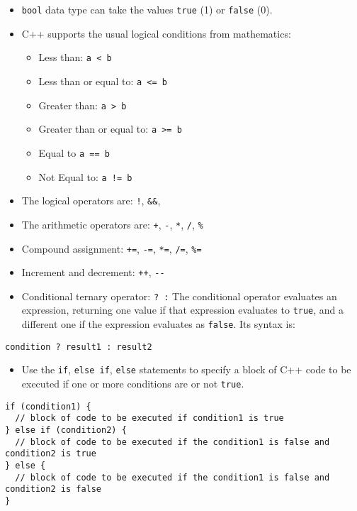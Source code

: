 \begin{itemize}
\tightlist
\item
  \texttt{bool} data type can take the values \texttt{true} (1) or \texttt{false} (0).
\item
  C++ supports the usual logical conditions from mathematics:

  \begin{itemize}
  \tightlist
  \item
    Less than: \texttt{a\ \textless{}\ b}
  \item
    Less than or equal to: \texttt{a\ \textless{}=\ b}
  \item
    Greater than: \texttt{a\ \textgreater{}\ b}
  \item
    Greater than or equal to: \texttt{a\ \textgreater{}=\ b}
  \item
    Equal to \texttt{a\ ==\ b}
  \item
    Not Equal to: \texttt{a\ !=\ b}
  \end{itemize}
\item
  The logical operators are: \texttt{!}, \texttt{\&\&}, \texttt{\textbar{}\textbar{}}
\item
  The arithmetic operators are: \texttt{+}, \texttt{-}, \texttt{*}, \texttt{/}, \texttt{\%}
\item
  Compound assignment: \texttt{+=}, \texttt{-=}, \texttt{*=}, \texttt{/=}, \texttt{\%=}
\item
  Increment and decrement: \texttt{++}, \texttt{-\/-}
\item
  Conditional ternary operator: \texttt{?\ :}
  The conditional operator evaluates an expression, returning one value if that expression evaluates to \texttt{true}, and a different one if the expression evaluates as \texttt{false}. Its syntax is:
\end{itemize}

\begin{verbatim}
condition ? result1 : result2
\end{verbatim}

\begin{itemize}
\tightlist
\item
  Use the \texttt{if}, \texttt{else\ if}, \texttt{else} statements to specify a block of C++ code to be executed if one or more conditions are or not \texttt{true}.
\end{itemize}

\begin{verbatim}
if (condition1) {
  // block of code to be executed if condition1 is true
} else if (condition2) {
  // block of code to be executed if the condition1 is false and condition2 is true
} else {
  // block of code to be executed if the condition1 is false and condition2 is false
}
\end{verbatim}

